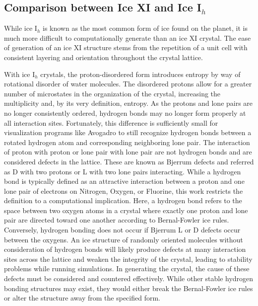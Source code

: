%
%


\subsection{Comparison between Ice XI and Ice I$_{h}$}

While ice I$_{h}$ is known as the most common form of ice found on the planet, it is much more difficult to computationally generate than an ice XI crystal. 
The ease of generation of an ice XI structure stems from the repetition of a unit cell with consistent layering and orientation throughout the crystal lattice. 


With ice I$_{h}$ crystals, the proton-disordered form introduces entropy by way of rotational disorder of water molecules. 
The disordered protons allow for a greater number of microstates in the organization of the crystal, increasing the multiplicity and, by its very definition, entropy.
As the protons and lone pairs are no longer consistently ordered, hydrogen bonds may no longer form properly at all interaction sites. 
Fortunately, this difference is sufficiently small for visualization programs like Avogadro to still recognize hydrogen bonds between a rotated hydrogen atom and corresponding neighboring lone pair. 
The interaction of proton with proton or lone pair with lone pair are not hydrogen bonds and are considered defects in the lattice. 
These are known as Bjerrum defects and referred as D with two protons or L with two lone pairs interacting.\cite{BjerrumDefects}
While a hydrogen bond is typically defined as an attractive interaction between a proton and one lone pair of electrons on Nitrogen, Oxygen, or Fluorine, this work restricts the definition to a computational implication.
Here, a hydrogen bond refers to the space between two oxygen atoms in a crystal where exactly one proton and lone pair are directed toward one another according to Bernal-Fowler ice rules. 
Conversely, hydrogen bonding does not occur if Bjerrum L or D defects occur between the oxygens.
An ice structure of randomly oriented molecules without consideration of hydrogen bonds will likely produce defects at many interaction sites across the lattice and weaken the integrity of the crystal, leading to stability problems while running simulations. 
In generating the crystal, the cause of these defects must be considered and countered effectively.
While other stable hydrogen bonding structures may exist, they would either break the Bernal-Fowler ice rules or alter the structure away from the specified form.



